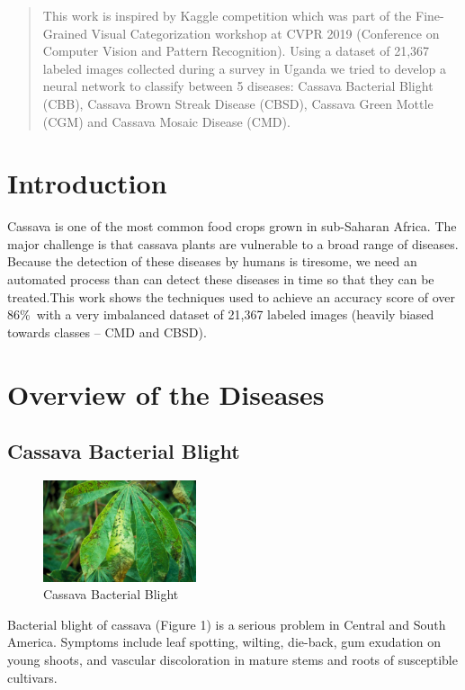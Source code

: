 \documentclass{article}
\begin{document}
 


\begin{abstract} 
This work is inspired by Kaggle competition which was part of the Fine-Grained Visual Categorization
workshop at CVPR 2019 (Conference on Computer Vision and Pattern Recognition). Using a dataset of 21,367 labeled images collected during a survey in Uganda we tried to develop a neural network to classify between 5 diseases: Cassava Bacterial Blight (CBB), Cassava Brown Streak Disease (CBSD), Cassava Green Mottle (CGM) and Cassava Mosaic Disease (CMD).
\end{abstract} 


\section{Introduction}
Cassava is one of the most common
food crops grown in sub-Saharan Africa. The
major challenge is that cassava plants are vulnerable to a broad
range of diseases. Because the detection of these diseases by humans is tiresome, we need an automated process than can detect these diseases in time so that they can be treated.This work shows the techniques used to achieve an accuracy score of over 86\%\, with a very imbalanced dataset of 21,367 labeled images (heavily biased towards classes – CMD and CBSD).

\section{Overview of the Diseases} 

\subsection{Cassava Bacterial Blight}
\begin{figure}[!htb]
    \centering
    \includegraphics[width=0.4\textwidth]{cassavabb.png}
    \caption{Cassava Bacterial Blight}
    \label{CBB}
\end{figure}
Bacterial blight of cassava (Figure 1) is a serious problem in Central and South America. Symptoms include leaf spotting, wilting, die-back, gum exudation on young shoots, and vascular discoloration in mature stems and roots of susceptible cultivars\cite{J.C.Lozano}.
\end{document}
